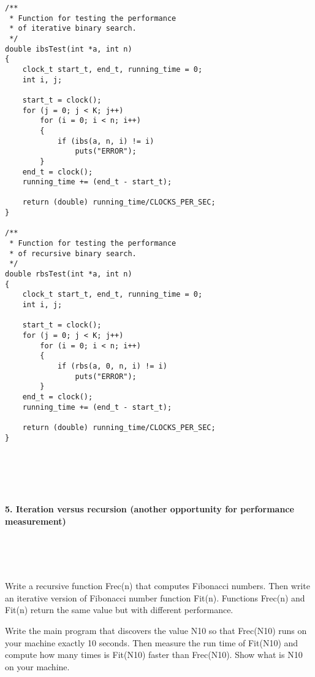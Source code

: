 \documentclass{article}
\begin{document}
\begin{verbatim}
/**
 * Function for testing the performance
 * of iterative binary search.
 */
double ibsTest(int *a, int n)
{
    clock_t start_t, end_t, running_time = 0;
    int i, j;

    start_t = clock();
    for (j = 0; j < K; j++)
        for (i = 0; i < n; i++)
        {
            if (ibs(a, n, i) != i)
                puts("ERROR");
        }
    end_t = clock();
    running_time += (end_t - start_t);

    return (double) running_time/CLOCKS_PER_SEC;
}

/**
 * Function for testing the performance
 * of recursive binary search.
 */
double rbsTest(int *a, int n)
{
    clock_t start_t, end_t, running_time = 0;
    int i, j;

    start_t = clock();
    for (j = 0; j < K; j++)
        for (i = 0; i < n; i++)
        {
            if (rbs(a, 0, n, i) != i)
                puts("ERROR");
        }
    end_t = clock();
    running_time += (end_t - start_t);

    return (double) running_time/CLOCKS_PER_SEC;
}

		\end{verbatim}


\paragraph{}\
\paragraph{}\

	
	\rmfamily
	
	\paragraph{5. Iteration versus recursion (another opportunity for performance measurement) }\
	
	\rmfamily\
	
		Write a recursive function Frec(n) that computes Fibonacci numbers. Then write an iterative version of Fibonacci number function Fit(n). Functions Frec(n) and Fit(n) return the same value but with different performance.
		\newline
		
		Write the main program that discovers the value N10 so that Frec(N10) runs on your machine exactly 10 seconds. Then measure the run time of Fit(N10) and compute how many times is Fit(N10) faster than Frec(N10). Show what is N10 on your machine.
		\newline
		
\end{document}
